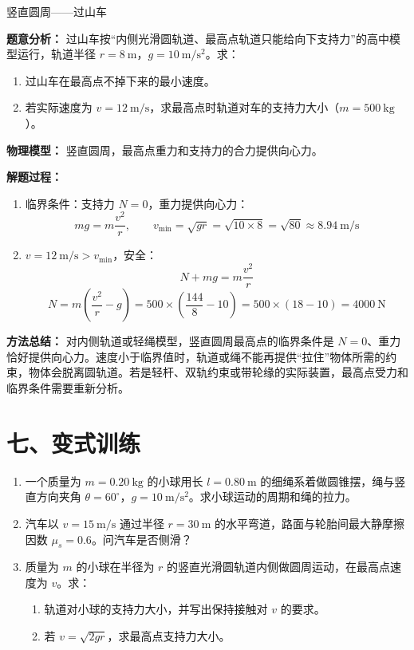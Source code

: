 \begin{examplebox}{竖直圆周——过山车}

\textbf{题意分析：} 过山车按“内侧光滑圆轨道、最高点轨道只能给向下支持力”的高中模型运行，轨道半径 $r = 8\ \mathrm{m}$，$g = 10\ \mathrm{m/s^2}$。求：
\begin{enumerate}
  \item 过山车在最高点不掉下来的最小速度。
  \item 若实际速度为 $v = 12\ \mathrm{m/s}$，求最高点时轨道对车的支持力大小（$m = 500\ \mathrm{kg}$）。
\end{enumerate}

\textbf{物理模型：} 竖直圆周，最高点重力和支持力的合力提供向心力。

\textbf{解题过程：}

\begin{enumerate}
  \item 临界条件：支持力 $N = 0$，重力提供向心力：
  \[
  mg = m\frac{v^2}{r},\qquad v_{\min} = \sqrt{gr} = \sqrt{10 \times 8} = \sqrt{80} \approx 8.94\ \mathrm{m/s}
  \]

  \item $v = 12\ \mathrm{m/s} > v_{\min}$，安全：
  \[
  N + mg = m\frac{v^2}{r}
  \]
  \[
  N = m(\frac{v^2}{r} - g) = 500 \times (\frac{144}{8} - 10) = 500 \times (18 - 10) = 4000\ \mathrm{N}
  \]
\end{enumerate}

\textbf{方法总结：} 对内侧轨道或轻绳模型，竖直圆周最高点的临界条件是 $N=0$、重力恰好提供向心力。速度小于临界值时，轨道或绳不能再提供“拉住”物体所需的约束，物体会脱离圆轨道。若是轻杆、双轨约束或带轮缘的实际装置，最高点受力和临界条件需要重新分析。

\end{examplebox}

\section*{七、变式训练}

\begin{enumerate}
  \item 一个质量为 $m=0.20\ \mathrm{kg}$ 的小球用长 $l=0.80\ \mathrm{m}$ 的细绳系着做圆锥摆，绳与竖直方向夹角 $\theta=60^\circ$，$g=10\ \mathrm{m/s^2}$。求小球运动的周期和绳的拉力。

  \item 汽车以 $v = 15\ \mathrm{m/s}$ 通过半径 $r = 30\ \mathrm{m}$ 的水平弯道，路面与轮胎间最大静摩擦因数 $\mu_s = 0.6$。问汽车是否侧滑？

  \item 质量为 $m$ 的小球在半径为 $r$ 的竖直光滑圆轨道内侧做圆周运动，在最高点速度为 $v$。求：
  \begin{center}
  
  \end{center}
  \begin{enumerate}
    \item 轨道对小球的支持力大小，并写出保持接触对 $v$ 的要求。
    \item 若 $v = \sqrt{2gr}$，求最高点支持力大小。
  \end{enumerate}
\end{enumerate}

